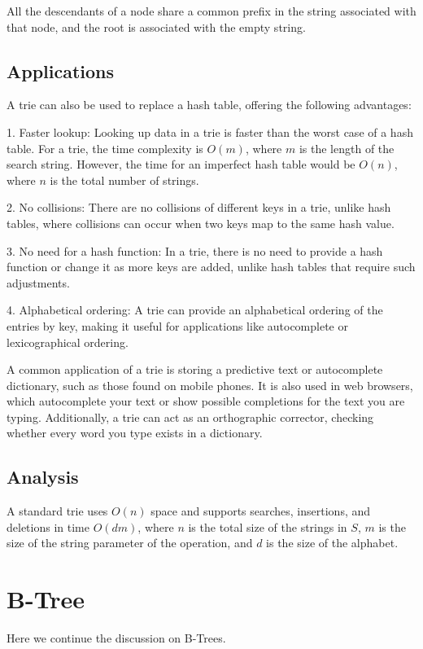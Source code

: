  

All the descendants of a node share a common prefix in the string associated with that node, and the root is associated with the empty string.

\subsection{Applications}
A trie can also be used to replace a hash table, offering the following advantages:

1. Faster lookup: Looking up data in a trie is faster than the worst case of a hash table. For a trie, the time complexity is \(O(m)\), where \(m\) is the length of the search string. However, the time for an imperfect hash table would be \(O(n)\), where \(n\) is the total number of strings.

2. No collisions: There are no collisions of different keys in a trie, unlike hash tables, where collisions can occur when two keys map to the same hash value.

3. No need for a hash function: In a trie, there is no need to provide a hash function or change it as more keys are added, unlike hash tables that require such adjustments.

4. Alphabetical ordering: A trie can provide an alphabetical ordering of the entries by key, making it useful for applications like autocomplete or lexicographical ordering.

A common application of a trie is storing a predictive text or autocomplete dictionary, such as those found on mobile phones. It is also used in web browsers, which autocomplete your text or show possible completions for the text you are typing. Additionally, a trie can act as an orthographic corrector, checking whether every word you type exists in a dictionary.

\subsection{Analysis}
A standard trie uses \(O(n)\) space and supports searches, insertions, and deletions in time \(O(dm)\), where \(n\) is the total size of the strings in \(S\), \(m\) is the size of the string parameter of the operation, and \(d\) is the size of the alphabet.

\section{B-Tree}
Here we continue the discussion on B-Trees.  

